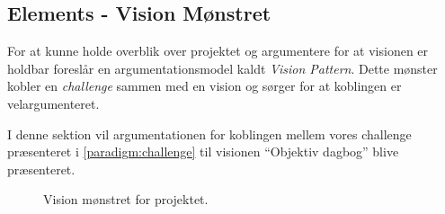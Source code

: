 \subsection{Elements - Vision Mønstret}
For at kunne holde overblik over projektet og argumentere for at visionen er holdbar foreslår \citet[Kapitel 15 - Project]{art:essence} en argumentationsmodel kaldt \emph{Vision Pattern}. 
Dette mønster kobler en \emph{challenge} sammen med en vision og sørger for at koblingen er velargumenteret.

I denne sektion vil argumentationen for koblingen mellem vores challenge præsenteret i \cref{paradigm:challenge} til visionen ``Objektiv dagbog'' blive præsenteret.

\begin{figure}[h]
	\centering
	\resizebox{\columnwidth}{!}{
	}
	\caption{Vision mønstret for projektet.}
	\label{fig:visionpattern}
\end{figure}


